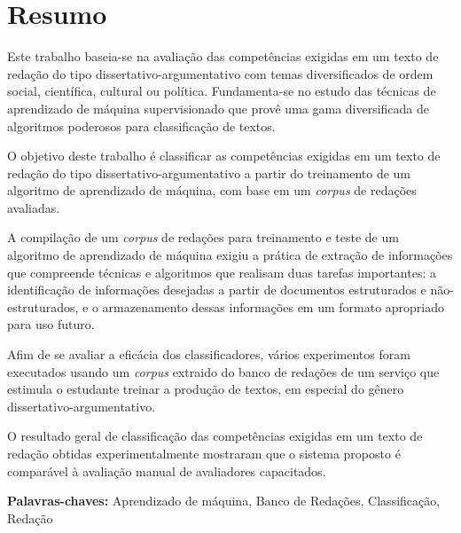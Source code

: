 \chapter*{Resumo}

\noindent Este trabalho baseia-se na avaliação das competências exigidas em um texto de redação do tipo dissertativo-argumentativo com temas diversificados de ordem social, científica, cultural ou política. Fundamenta-se no estudo das técnicas de aprendizado de máquina supervisionado que provê uma gama diversificada de algoritmos poderosos para classificação de textos.

O objetivo deste trabalho é classificar as competências exigidas em um texto de redação do tipo dissertativo-argumentativo a partir do treinamento de um algoritmo de aprendizado de máquina, com base em um \textit{corpus} de redações avaliadas.

A compilação de um \textit{corpus} de redações para treinamento e teste de um algoritmo de aprendizado de máquina exigiu a prática de extração de informações que compreende técnicas e algoritmos que realisam duas tarefas importantes: a identificação de informações desejadas a partir de documentos estruturados e não-estruturados, e o armazenamento dessas informações em um formato apropriado para uso futuro.

Afim de se avaliar a eficácia dos classificadores, vários experimentos foram executados usando um \textit{corpus} extraido do banco de redações de um serviço que estimula o estudante treinar a produção de textos, em especial do gênero dissertativo-argumentativo. 

O resultado geral de classificação das competências exigidas em um texto de redação obtidas experimentalmente mostraram que o sistema proposto é comparável à avaliação manual de avaliadores capacitados.

\textbf{Palavras-chaves:} Aprendizado de máquina, Banco de Redações, Classificação, Redação